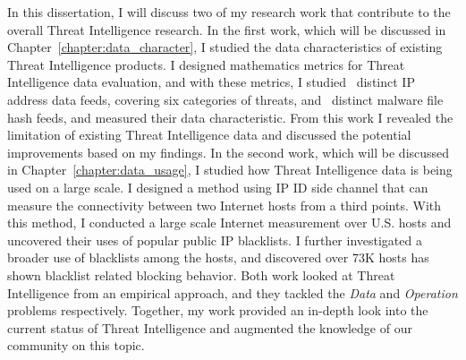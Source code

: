 \begin{dissertationintroduction}
In this dissertation, I will discuss two of my research work 
that contribute to the overall Threat Intelligence research. In the first
work, which will be discussed in Chapter~\ref{chapter:data_character}, 
I studied the data characteristics of existing Threat Intelligence products.
I designed mathematics metrics for Threat Intelligence data evaluation,
and with these metrics, I studied \numipfeeds\ distinct IP address 
data feeds, covering six categories of threats, and \numhashfeeds\ distinct
malware file hash feeds, and measured their data characteristic. From this
work I revealed the limitation of existing Threat Intelligence data and 
discussed the potential improvements based on my findings. In the second
work, which will be discussed in Chapter~\ref{chapter:data_usage}, I 
studied how Threat Intelligence data is being used on a large scale. 
I designed a method using IP ID side channel that can measure the 
connectivity between two Internet hosts from a third points. With this 
method, I conducted a large scale Internet measurement over {} 
U.S. hosts and uncovered their uses of {\blacklistnum} popular public IP
blacklists. I further investigated a broader use of blacklists among the 
hosts, and discovered over 73K hosts has shown blacklist related blocking 
behavior. Both work looked at Threat Intelligence from an empirical
approach, and they tackled the \textit{Data} and \textit{Operation} problems
respectively. Together, my work provided an in-depth look into the current
status of Threat Intelligence and augmented the knowledge of our community
on this topic.

\end{dissertationintroduction}
